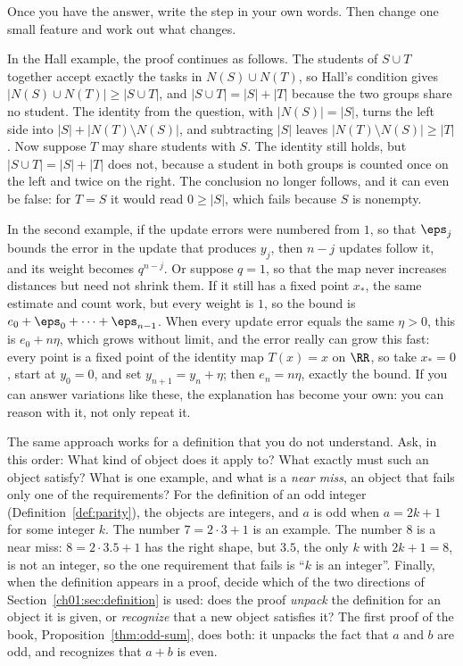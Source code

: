 Once you have the answer, write the step in your own words. Then change one small feature and work out what changes.

In the Hall example, the proof continues as follows. The students of $S\cup T$ together accept exactly the tasks in $N(S)\cup N(T)$, so Hall's condition gives $|N(S)\cup N(T)|\ge|S\cup T|$, and $|S\cup T|=|S|+|T|$ because the two groups share no student. The identity from the question, with $|N(S)|=|S|$, turns the left side into $|S|+|N(T)\setminus N(S)|$, and subtracting $|S|$ leaves $|N(T)\setminus N(S)|\ge|T|$. Now suppose $T$ may share students with $S$. The identity still holds, but $|S\cup T|=|S|+|T|$ does not, because a student in both groups is counted once on the left and twice on the right. The conclusion no longer follows, and it can even be false: for $T=S$ it would read $0\ge|S|$, which fails because $S$ is nonempty.

In the second example, if the update errors were numbered from $1$, so that $\eps_j$ bounds the error in the update that produces $y_j$, then $n-j$ updates follow it, and its weight becomes $q^{n-j}$. Or suppose $q=1$, so that the map never increases distances but need not shrink them. If it still has a fixed point $x_*$, the same estimate and count work, but every weight is $1$, so the bound is $e_0+\eps_0+\cdots+\eps_{n-1}$. When every update error equals the same $\eta>0$, this is $e_0+n\eta$, which grows without limit, and the error really can grow this fast: every point is a fixed point of the identity map $T(x)=x$ on $\RR$, so take $x_*=0$, start at $y_0=0$, and set $y_{n+1}=y_n+\eta$; then $e_n=n\eta$, exactly the bound. If you can answer variations like these, the explanation has become your own: you can reason with it, not only repeat it.

The same approach works for a definition that you do not understand. Ask, in this order: What kind of object does it apply to? What exactly must such an object satisfy? What is one example, and what is a \emph{near miss}, an object that fails only one of the requirements? For the definition of an odd integer (Definition~\ref{def:parity}), the objects are integers, and $a$ is odd when $a=2k+1$ for some integer $k$. The number $7=2\cdot3+1$ is an example. The number $8$ is a near miss: $8=2\cdot3.5+1$ has the right shape, but $3.5$, the only $k$ with $2k+1=8$, is not an integer, so the one requirement that fails is ``$k$ is an integer''. Finally, when the definition appears in a proof, decide which of the two directions of Section~\ref{ch01:sec:definition} is used: does the proof \emph{unpack} the definition for an object it is given, or \emph{recognize} that a new object satisfies it? The first proof of the book, Proposition~\ref{thm:odd-sum}, does both: it unpacks the fact that $a$ and $b$ are odd, and recognizes that $a+b$ is even.
